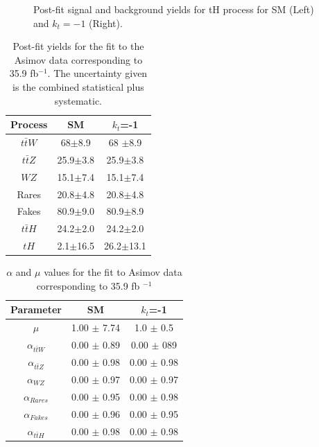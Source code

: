 \begin{figure}[!htbp]
\begin{minipage}[b]{0.48\textwidth}
		\end{minipage}
		\caption{Post-fit signal and background yields for tH process for SM (Left) and $k_t=-1$ (Right).
		}
		\label{simple}
	\end{figure}
	
	\begin{table}[ht!]
		\centering
		\caption{Post-fit  yields for the fit to the Asimov data corresponding to 35.9 fb$^{-1}$. The uncertainty given is the combined statistical plus systematic.}
		\begin{tabular}{ccc}
			\hline
			Process  & SM    & $k_{t}$=-1 \\
			\hline
			$t\bar{t}W$  &  68$\pm$8.9& 68 $\pm$8.9 \\
			$t\bar{t}Z$  & 25.9$\pm$3.8&25.9$\pm$3.8\\
			$WZ$ &  15.1$\pm$7.4& 15.1$\pm$7.4\\
			Rares &  20.8$\pm$4.8& 20.8$\pm$4.8 \\
			Fakes  &  80.9$\pm$9.0&  80.9$\pm$8.9 \\
			$t\bar{t}H$  &   24.2$\pm$2.0 &  24.2$\pm$2.0 \\
			\hline
			$tH$&  2.1$\pm$16.5 &26.2$\pm$13.1 
		\end{tabular}
		\label{table1}
	\end{table}
	
	
	\begin{table}[ht!]
		\small
		\centering
		\caption{$\alpha$ and $\mu$ values  for the fit to Asimov data corresponding to 35.9 fb $^{-1}$}
		\begin{tabular}{ccc}
			\hline
			Parameter  & SM &$k_t$=-1\\
			\hline
			$\mu$   & 1.00 $\pm$  7.74& 1.0 $\pm$  0.5\\
			$\alpha_{t\bar{t}W}$&  0.00 $\pm$  0.89&  0.00 $\pm$  089\\
			$\alpha_{t\bar{t}Z}$ &  0.00 $\pm$  0.98& 0.00 $\pm$  0.98\\
			$\alpha_{WZ}$   & 0.00 $\pm$  0.97& 0.00 $\pm$  0.97\\
			$\alpha_{Rares}$   &0.00 $\pm$  0.95&0.00 $\pm$  0.98 \\
			$\alpha_{Fakes}$ &   0.00 $\pm$  0.96& 0.00 $\pm$  0.95\\
			$\alpha_{t\bar{t}H}$ &0.00 $\pm$  0.98& 0.00 $\pm$ 0.98\\
		\end{tabular}
		\label{parameters}
	\end{table}
	
